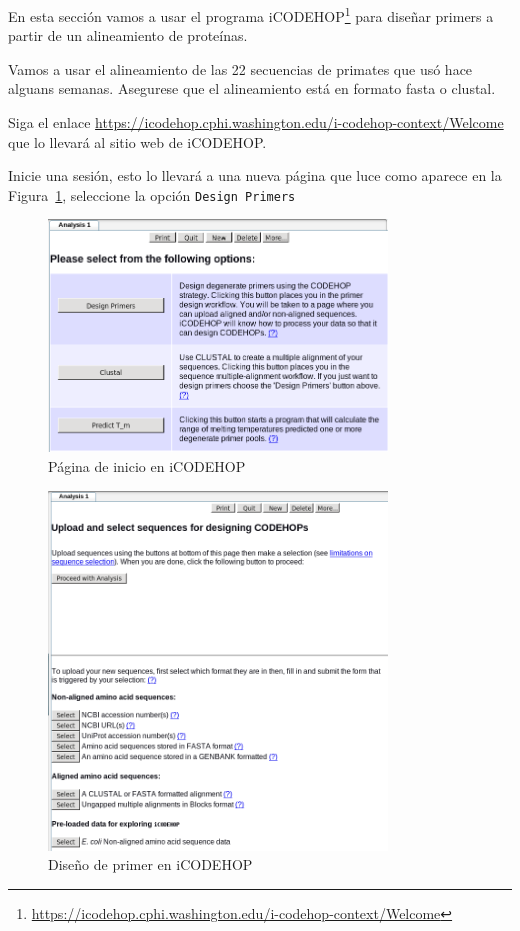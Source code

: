 \documentclass[letter,11pt]{book}
\begin{document}
En esta sección vamos a usar el programa iCODEHOP\footnote{\url{https://icodehop.cphi.washington.edu/i-codehop-context/Welcome}} para diseñar primers a partir de un alineamiento de proteínas.

Vamos a usar el alineamiento de las 22 secuencias de primates que usó hace alguans semanas. Asegurese que el alineamiento está en formato fasta o clustal.

Siga el enlace \url{https://icodehop.cphi.washington.edu/i-codehop-context/Welcome} que lo llevará al sitio web de iCODEHOP. 

Inicie una sesión, esto lo llevará a una nueva página que luce como aparece en la Figura~\ref{fig:CODEHOP_start}, seleccione la opción \Verb+Design Primers+

\begin{figure}[h!]
\centering
 \includegraphics[width=9cm]{Figs/CODEHOP_start.png}
 \caption{\label{fig:CODEHOP_start}Página de inicio en iCODEHOP}
\end{figure}

\begin{figure}[hb!]
\centering
 \includegraphics[width=9cm]{Figs/CODEHOP_design.png}
 \caption{\label{fig:CODEHOP_design}Diseño de primer en iCODEHOP}
\end{figure}
\end{document}
